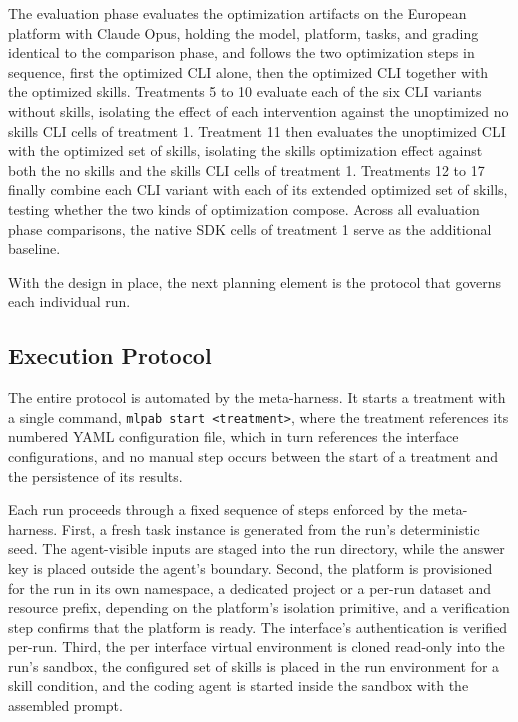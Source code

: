 \documentclass[
english,                 %
bibtex,                  %
]{kththesis}
\numberwithin{listing}{chapter}
\begin{document}
The evaluation phase evaluates the optimization artifacts on the European platform with Claude Opus, holding the model, platform, tasks, and grading identical to the comparison phase, and follows the two optimization steps in sequence, first the optimized \gls{CLI} alone, then the optimized \gls{CLI} together with the optimized skills. Treatments 5 to 10 evaluate each of the six \gls{CLI} variants without skills, isolating the effect of each intervention against the unoptimized no skills \gls{CLI} cells of treatment 1. Treatment 11 then evaluates the unoptimized \gls{CLI} with the optimized set of skills, isolating the skills optimization effect against both the no skills and the skills \gls{CLI} cells of treatment 1. Treatments 12 to 17 finally combine each \gls{CLI} variant with each of its extended optimized set of skills, testing whether the two kinds of optimization compose. Across all evaluation phase comparisons, the native \gls{SDK} cells of treatment 1 serve as the additional baseline.

With the design in place, the next planning element is the protocol that governs each individual run.

\subsection{Execution Protocol}
\label{sec:method_execution_protocol}
\glsresetall

The entire protocol is automated by the meta-harness. It starts a treatment with a single command, \texttt{mlpab start <treatment>}, where the treatment references its numbered \gls{YAML} configuration file, which in turn references the interface configurations, and no manual step occurs between the start of a treatment and the persistence of its results.

Each run proceeds through a fixed sequence of steps enforced by the meta-harness. First, a fresh task instance is generated from the run's deterministic seed. The agent-visible inputs are staged into the run directory, while the answer key is placed outside the agent's boundary. Second, the platform is provisioned for the run in its own namespace, a dedicated project or a per-run dataset and resource prefix, depending on the platform's isolation primitive, and a verification step confirms that the platform is ready. The interface's authentication is verified per-run. Third, the per interface virtual environment is cloned read-only into the run's sandbox, the configured set of skills is placed in the run environment for a skill condition, and the coding agent is started inside the sandbox with the assembled prompt.
\end{document}
